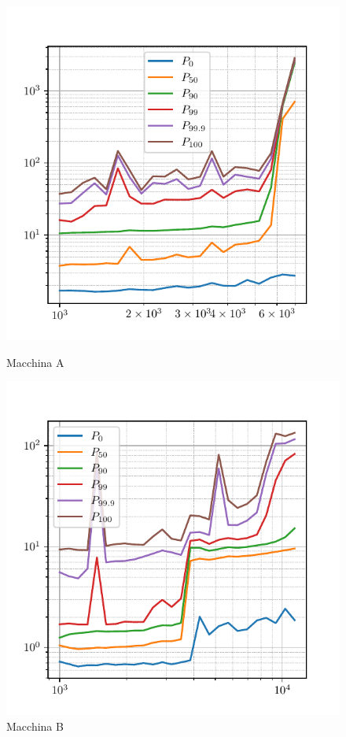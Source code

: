 \begin{figure}[htbp]
    \centering
    \begin{minipage}[t]{0.48\textwidth}
        \centering
        \includegraphics[width=\textwidth]{03-risultati/freq-latency/bench-set-a}
        \caption*{Macchina A}
    \end{minipage}
    \hfill
    \begin{minipage}[t]{0.48\textwidth}
        \centering
        \includegraphics[width=\textwidth]{03-risultati/freq-latency/bench-set-c}
        \caption*{Macchina B}
    \end{minipage}


\end{figure}
